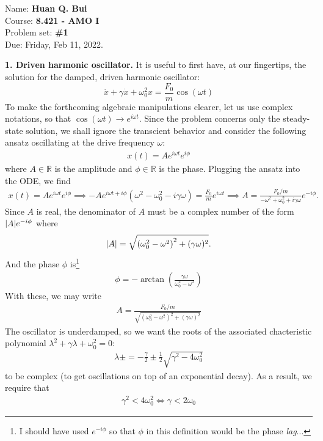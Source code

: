 \documentclass{article}
\theoremstyle{definition}
\newcommand{\f}[2]{\frac{#1}{#2}}
\newcommand{\lp}{\left(}
\newcommand{\rp}{\right)}
\begin{document}
\begin{framed}
\noindent Name: \textbf{Huan Q. Bui}\\
Course: \textbf{8.421 - AMO I}\\
Problem set: \textbf{\#1}\\
Due: Friday, Feb 11, 2022.
\end{framed}
	
	
\noindent \textbf{1. Driven harmonic oscillator.} It is useful to first have, at our fingertips, the solution for the damped, driven harmonic oscillator:
\begin{equation*}
\ddot x + \gamma \dot x + \omega_0^2 x = \f{F_0}{m}\cos(\omega t)
\end{equation*}
To make the forthcoming algebraic manipulations clearer, let us use complex notations, so that $\cos(\omega t) \to e^{i\omega t}$. Since the problem concerns only the steady-state solution, we shall ignore the transcient behavior and consider the following ansatz oscillating at the drive frequency $\omega$:
\begin{align*}
x(t) = A e^{i\omega t } e^{i\phi}
\end{align*}
where $A \in \mathbb{R}$ is the amplitude and $\phi \in \mathbb{R}$ is the phase. Plugging the ansatz into the ODE, we find 
\begin{align*}
x(t) = A e^{i\omega t} e^{i\phi} \implies -A e^{i \omega t + i\phi} \lp \omega^2 -\omega_0^2 - i\gamma \omega \rp = \f{F_0}{m}e^{i\omega t} \implies A = \f{F_0/m}{-\omega^2 + \omega_0^2 + i\gamma \omega} e^{-i\phi}.
\end{align*}
Since $A$ is real, the denominator of $A$ must be a complex number of the form $\abs{A} e^{-i\phi}$ where
\begin{align*}
\abs{A} = \sqrt{{(\omega_0^2 - \omega^2)}^2 + (\gamma \omega)^2}.
\end{align*}
And the phase $\phi$ is\footnote{I should have used $e^{-i\phi}$ so that $\phi$ in this definition would be the phase \textit{lag}...}
\begin{align*}
\boxed{\phi = -\arctan(\f{\gamma\omega}{\omega_0^2 - \omega^2})}
\end{align*}
With these, we may write
\begin{align*}
\boxed{A = \f{F_0/m}{\sqrt{(\omega_0^2 - \omega^2)^2 + (\gamma \omega)^2}}}
\end{align*}
The oscillator is underdamped, so we want the roots of the associated chacteristic polynomial $\lambda^2 + \gamma \lambda + \omega_0^2 = 0$:
\begin{align*}
\lambda\pm = -\f{\gamma}{2} \pm \f{1}{2}\sqrt{\gamma^2 - 4\omega_0^2}
\end{align*}
to be complex (to get oscillations on top of an exponential decay). As a result, we require that 
\begin{align*}
\gamma^2 < 4\omega_0^2 \iff \boxed{\gamma < 2\omega_0}
\end{align*}
\end{document}
